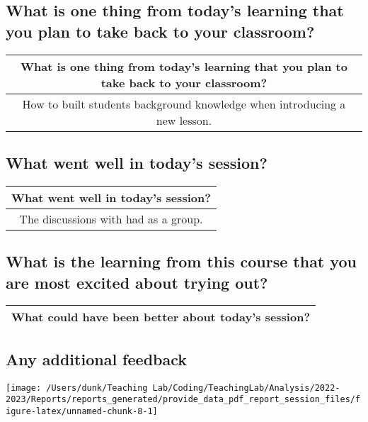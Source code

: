 \documentclass[10,a4paperpaper,]{article}
\begin{document}
\subsection{What is one thing from today's learning that you plan to take back to your classroom?}

\captionsetup[table]{labelformat=empty,skip=1pt}
\begin{longtable}{c}
\toprule
What is one thing from today's learning that you plan to take back to your classroom? \\ 
\midrule
How to built students\textquotesingle{} background knowledge when introducing a new lesson. \\ 
\bottomrule
\end{longtable}

\subsection{What went well in today's session?}

\captionsetup[table]{labelformat=empty,skip=1pt}
\begin{longtable}{c}
\toprule
What went well in today’s session? \\ 
\midrule
The discussions with had as a group. \\ 
\bottomrule
\end{longtable}

\subsection{What is the learning from this course that you are most excited about trying out?}

\captionsetup[table]{labelformat=empty,skip=1pt}
\begin{longtable}{c}
\toprule
What could have been better about today’s session? \\ 
\midrule
\bottomrule
\end{longtable}

\subsection{Any additional feedback}

\begin{center}\texttt{[image: /Users/dunk/Teaching Lab/Coding/TeachingLab/Analysis/2022-2023/Reports/reports\_generated/provide\_data\_pdf\_report\_session\_files/figure-latex/unnamed-chunk-8-1]} \end{center}
\end{document}
